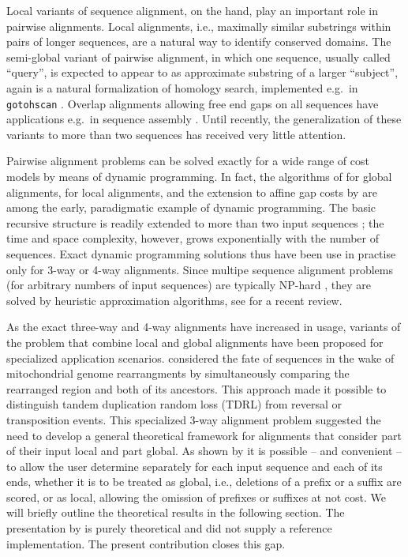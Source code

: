 \documentclass[a4paper,10pt]{article}
\begin{document}
Local variants of sequence alignment, on the hand, play an important role
in pairwise alignments. Local alignments, i.e., maximally similar
substrings within pairs of longer sequences, are a natural way to identify
conserved domains.  The semi-global variant of pairwise alignment, in which
one sequence, usually called ``query'', is expected to appear to as
approximate substring of a larger ``subject'', again is a natural
formalization of homology search, implemented e.g.\ in \texttt{gotohscan}
\cite{Hertel:09a}.  Overlap alignments
\cite{Jones:04} allowing free end gaps on all sequences have applications
e.g.\ in sequence assembly \cite{Rausch:09}. Until recently, the
generalization of these variants to more than two sequences has received
very little attention.

Pairwise alignment problems can be solved exactly for a wide range of cost
models by means of dynamic programming. In fact, the algorithms of
\citet{Needleman:70} for global alignments, \citet{Smith:81} for local
alignments, and the extension to affine gap costs by \citet{Gotoh:82} are
among the early, paradigmatic example of dynamic programming. The basic
recursive structure is readily extended to more than two input sequences
\cite{Carillo:88,Lipman:89}; the time and space complexity, however, grows
exponentially with the number of sequences. Exact dynamic programming
solutions thus have been use in practise only for 3-way
\cite{Gotoh:86,Dewey:01,Konagurthu:04,Kruspe:07a} or 4-way
\cite{Steiner:11a} alignments. Since multipe sequence alignment problems
(for arbitrary numbers of input sequences) are typically NP-hard
\cite{Kececioglu:93,Wang:94,Bonizzoni:01,Just:01,Manthey:03,Elias:06}, they
are solved by heuristic approximation algorithms, see \citet{Baichoo:17}
for a recent review.

As the exact three-way and 4-way alignments have increased in usage,
variants of the problem that combine local and global alignments have been
proposed for specialized application scenarios. \citet{AlArab:17a}
considered the fate of sequences in the wake of mitochondrial genome
rearrangments by simultaneously comparing the rearranged region and both of
its ancestors. This approach made it possible to distinguish tandem
duplication random loss (TDRL) from reversal or transposition events. This
specialized 3-way alignment problem suggested the need to develop a general
theoretical framework for alignments that consider part of their input
local and part global. As shown by \citet{Retzlaff:18a} it is possible --
and convenient -- to allow the user determine separately for each input
sequence and each of its ends, whether it is to be treated as global, i.e.,
deletions of a prefix or a suffix are scored, or as local, allowing the
omission of prefixes or suffixes at not cost. We will briefly outline the
theoretical results in the following section. The presentation by
\citet{Retzlaff:18a} is purely theoretical and did not supply a reference
implementation. The present contribution closes this gap.
\end{document}
